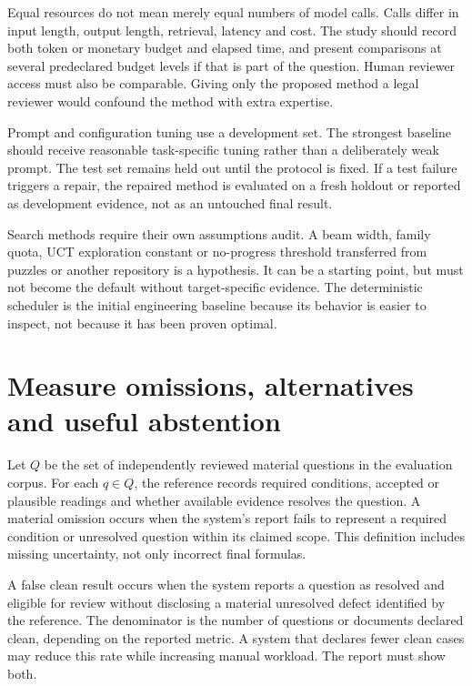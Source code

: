 \documentclass[12pt,a4paper,oneside,openany]{book}
\begin{document}
Equal resources do not mean merely equal numbers of model calls. Calls differ in
input length, output length, retrieval, latency and cost. The study should record
both token or monetary budget and elapsed time, and present comparisons at
several predeclared budget levels if that is part of the question. Human reviewer
access must also be comparable. Giving only the proposed method a legal reviewer
would confound the method with extra expertise.

Prompt and configuration tuning use a development set. The strongest baseline
should receive reasonable task-specific tuning rather than a deliberately weak
prompt. The test set remains held out until the protocol is fixed. If a test
failure triggers a repair, the repaired method is evaluated on a fresh holdout or
reported as development evidence, not as an untouched final result.

Search methods require their own assumptions audit. A beam width, family quota,
UCT exploration constant or no-progress threshold transferred from puzzles or
another repository is a hypothesis. It can be a starting point, but must not
become the default without target-specific evidence. The deterministic scheduler
is the initial engineering baseline because its behavior is easier to inspect,
not because it has been proven optimal.

\section{Measure omissions, alternatives and useful abstention}

Let $Q$ be the set of independently reviewed material questions in the evaluation
corpus. For each $q\in Q$, the reference records required conditions, accepted or
plausible readings and whether available evidence resolves the question. A
material omission occurs when the system's report fails to represent a required
condition or unresolved question within its claimed scope. This definition
includes missing uncertainty, not only incorrect final formulas.

A false clean result occurs when the system reports a question as resolved and
eligible for review without disclosing a material unresolved defect identified by
the reference. The denominator is the number of questions or documents declared
clean, depending on the reported metric. A system that declares fewer clean cases
may reduce this rate while increasing manual workload. The report must show both.
\end{document}
